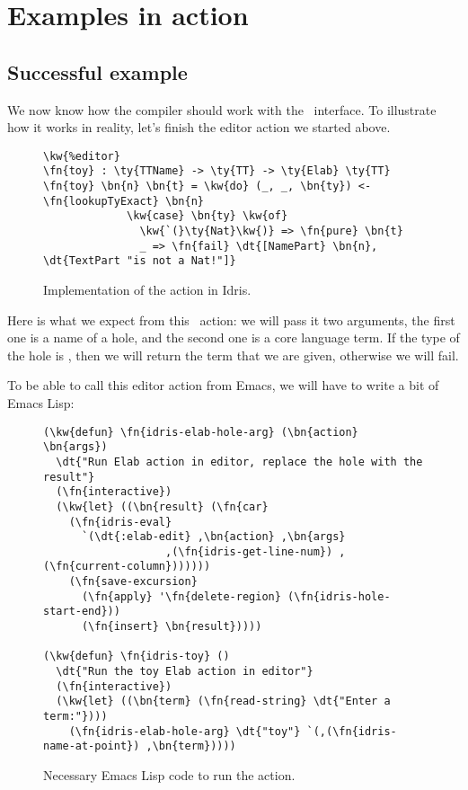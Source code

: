 \section{Examples in action}\label{sec:designExample}

\subsection{Successful example}

We now know how the compiler should work with the \Editorable\ interface.
To illustrate how it works in reality, let's finish the  editor action
we started above.

\begin{figure}[ht]
\caption{Implementation of the  action in Idris.}
\begin{Verbatim}[framesep=2mm, label=\footnotesize{\normalfont{Idris}}, labelposition=topline]
\kw{%editor}
\fn{toy} : \ty{TTName} -> \ty{TT} -> \ty{Elab} \ty{TT}
\fn{toy} \bn{n} \bn{t} = \kw{do} (_, _, \bn{ty}) <- \fn{lookupTyExact} \bn{n}
             \kw{case} \bn{ty} \kw{of}
               \kw{`(}\ty{Nat}\kw{)} => \fn{pure} \bn{t}
               _ => \fn{fail} \dt{[NamePart} \bn{n}, \dt{TextPart "is not a Nat!"]}
\end{Verbatim}
\end{figure}

Here is what we expect from this \Elab\ action: we will pass it two arguments,
the first one is a name of a hole, and the second one is a core language term.
If the type of the hole is , then we will return the term that we are
given, otherwise we will fail.

To be able to call this editor action from Emacs, we will have to write a bit
of Emacs Lisp:

\begin{figure}[ht]
\caption{Necessary Emacs Lisp code to run the  action.}
\begin{Verbatim}[framesep=2mm, label=\footnotesize{\normalfont{Emacs Lisp}}, labelposition=topline]
(\kw{defun} \fn{idris-elab-hole-arg} (\bn{action} \bn{args})
  \dt{"Run Elab action in editor, replace the hole with the result"}
  (\fn{interactive})
  (\kw{let} ((\bn{result} (\fn{car}
    (\fn{idris-eval}
      `(\dt{:elab-edit} ,\bn{action} ,\bn{args}
                   ,(\fn{idris-get-line-num}) ,(\fn{current-column}))))))
    (\fn{save-excursion}
      (\fn{apply} '\fn{delete-region} (\fn{idris-hole-start-end}))
      (\fn{insert} \bn{result}))))

(\kw{defun} \fn{idris-toy} ()
  \dt{"Run the toy Elab action in editor"}
  (\fn{interactive})
  (\kw{let} ((\bn{term} (\fn{read-string} \dt{"Enter a term:"})))
    (\fn{idris-elab-hole-arg} \dt{"toy"} `(,(\fn{idris-name-at-point}) ,\bn{term}))))
\end{Verbatim}
\end{figure}

